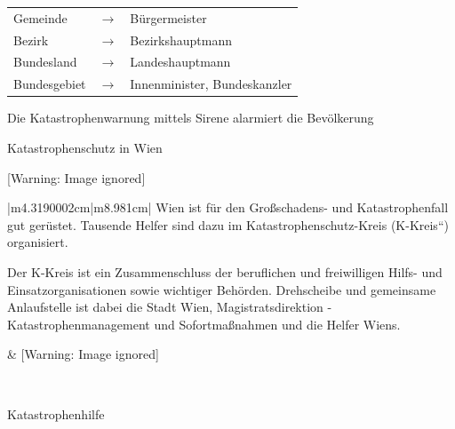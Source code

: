 \documentclass{article}
\makeatletter
\newcommand\captionof[1]{\def\@captype{#1}\caption}
\makeatother
\begin{document}
\begin{center}
\begin{tabular}{|m{2.375cm}m{0.45600003cm}m{6.1590004cm}|}
\hline
Gemeinde 

 &
\centering ${\rightarrow}$\par

 &
B\"urgermeister

\\
Bezirk 

 &
\centering ${\rightarrow}$\par

 &
Bezirkshauptmann

\\
Bundesland 

 &
\centering ${\rightarrow}$\par

 &
Landeshauptmann

\\
Bundesgebiet

 &
\centering ${\rightarrow}$\par

 &
Innenminister, Bundeskanzler

\\\hline
\end{tabular}
\end{center}
Die Katastrophenwarnung mittels Sirene alarmiert die Bev\"olkerung

Katastrophenschutz in Wien

\begin{center}
 [Warning: Image ignored] %

\end{center}
\begin{center}
\tablehead{}\begin{supertabular}{|m{4.3190002cm}|m{8.981cm}|}
\hline
Wien ist f\"ur den Gro{\ss}\-schadens- und Katastrophenfall gut
ger\"ustet. Tausende Helfer sind dazu im Katastrophen\-schutz-Kreis
({\quotedblbase}K-Kreis{\textquotedblleft}) org\-anisiert.

Der K-Kreis ist ein Zu\-sammen\-schluss der beruflichen und freiwilligen
Hilfs- und Ein\-satz\-organisationen sowie wichtiger Beh\"orden.
Dreh\-scheibe und gemeinsame Anlaufstelle ist dabei die Stadt Wien,
Magistrats\-direktion - Katastrophen\-manage\-ment und
Sofort\-ma{\ss}\-nahmen und die Helfer Wiens.

 &
 [Warning: Image ignored] %
\captionof{figure}[Der K-Kreis]{Der K-Kreis}


\\\hline
\end{supertabular}
\end{center}
Katastrophenhilfe
\end{document}
